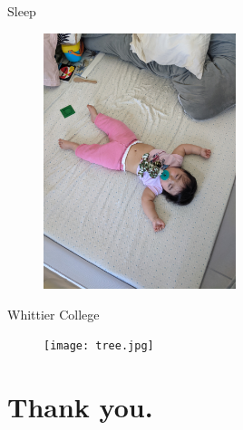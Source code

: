 \documentclass{beamer}
\begin{document}
\begin{frame}{Sleep}
\begin{figure}
\includegraphics[width=0.5\textwidth]{sleep.jpg}
\end{figure}
\end{frame}

\begin{frame}{Whittier College}
\begin{figure}
\texttt{[image: tree.jpg]}
\end{figure}
\end{frame}

\section{Thank you.}
\end{document}

